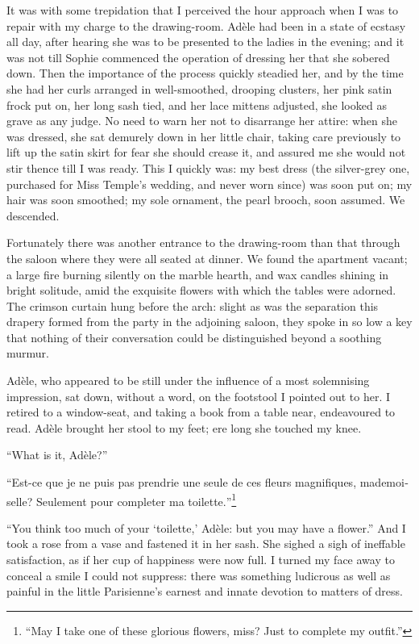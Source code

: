It was with some trepidation that I perceived the hour approach when I
was to repair with my charge to the drawing-room. Adèle had been in a
state of ecstasy all day, after hearing she was to be presented to the
ladies in the evening; and it was not till Sophie commenced the
operation of dressing her that she sobered down. Then the importance of
the process quickly steadied her, and by the time she had her curls
arranged in well-smoothed, drooping clusters, her pink satin frock put
on, her long sash tied, and her lace mittens adjusted, she looked as
grave as any judge. No need to warn her not to disarrange her attire:
when she was dressed, she sat demurely down in her little chair, taking
care previously to lift up the satin skirt for fear she should crease
it, and assured me she would not stir thence till I was ready. This I
quickly was: my best dress (the silver-grey one, purchased for Miss
Temple's wedding, and never worn since) was soon put on; my hair was
soon smoothed; my sole ornament, the pearl brooch, soon assumed. We
descended.

Fortunately there was another entrance to the drawing-room than that
through the saloon where they were all seated at dinner. We found the
apartment vacant; a large fire burning silently on the marble hearth,
and wax candles shining in bright solitude, amid the exquisite flowers
with which the tables were adorned. The crimson curtain hung before the
arch: slight as was the separation this drapery formed from the party in
the adjoining saloon, they spoke in so low a key that nothing of their
conversation could be distinguished beyond a soothing murmur.

Adèle, who appeared to be still under the influence of a most
solemnising impression, sat down, without a word, on the footstool I
pointed out to her. I retired to a window-seat, and taking a book from
a table near, endeavoured to read. Adèle brought her stool to my feet;
ere long she touched my knee.

\enquote{What is it, Adèle?}

\foreignquote{french}{Est-ce que je ne puis pas prendrie une seule de ces fleurs
	magnifiques, mademoiselle? Seulement pour completer ma toilette.}\footnote{
	\enquote{May I take one of these glorious flowers, miss? Just to complete my outfit.}}

\enquote{You think too much of your \foreignquote{french}{toilette,} Adèle: but you
	may have a flower.} And I took a rose from a vase and fastened it in
her sash. She sighed a sigh of ineffable satisfaction, as if her cup of
happiness were now full. I turned my face away to conceal a smile I
could not suppress: there was something ludicrous as well as painful in
the little Parisienne's earnest and innate devotion to matters of dress.

